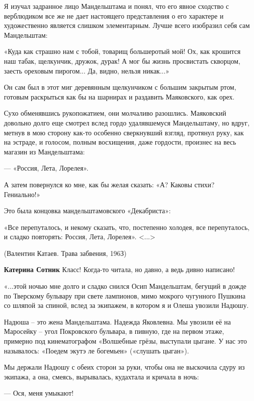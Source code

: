 \begin{itemize}
Я изучал задранное лицо Мандельштама и понял, что его явное сходство с
верблюдиком все же не дает настоящего представления о его характере и
художественно является слишком элементарным. Лучше всего изобразил себя сам
Мандельштам:

«Куда как страшно нам с тобой, товарищ большеротый мой! Ох, как крошится наш
табак, щелкунчик, дружок, дурак! А мог бы жизнь просвистать скворцом, заесть
ореховым пирогом... Да, видно, нельзя никак...»

Он сам был в этот миг деревянным щелкунчиком с большим закрытым ртом, готовым
раскрыться как бы на шарнирах и раздавить Маяковского, как орех.

Сухо обменявшись рукопожатием, они молчаливо разошлись. Маяковский довольно
долго еще смотрел вслед гордо удалявшемуся Мандельштаму, но вдруг, метнув в мою
сторону как-то особенно сверкнувший взгляд, протянул руку, как на эстраде, и
голосом, полным восхищения, даже гордости, произнес на весь магазин из
Мандельштама:

— «Россия, Лета, Лорелея».

А затем повернулся ко мне, как бы желая сказать: «А? Каковы стихи? Гениально!»

Это была концовка мандельштамовского «Декабриста»:

«Все перепуталось, и некому сказать, что, постепенно холодея, все перепуталось,
и сладко повторять: Россия, Лета, Лорелея». <...>

(Валентин Катаев. Трава забвения, 196З)


\textbf{Катерина Сотник} Класс! Когда-то читала, но давно, а ведь дивно написано!


«...этой ночью мне долго и сладко снился Осип Мандельштам, бегущий в дожде по
Тверскому бульвару при свете лампионов, мимо мокрого чугунного Пушкина со
шляпой за спиной, вслед за экипажем, в котором я и Олеша увозили Надюшу.

Надюша – это жена Мандельштама. Надежда Яковлевна. Мы увозили её на Маросейку –
угол Покровского бульвара, в пивную, где на первом этаже, примерно под
кинематографом «Волшебные грёзы, выступали цыгане. У нас это называлось:
«Поедем экутэ ле богемьен» («слушать цыган»).

Мы держали Надюшу с обеих сторон за руки, чтобы она не выскочила сдуру из
экипажа, а она, смеясь, вырывалась, кудахтала и кричала в ночь:

— Ося, меня умыкают!


\end{itemize}
